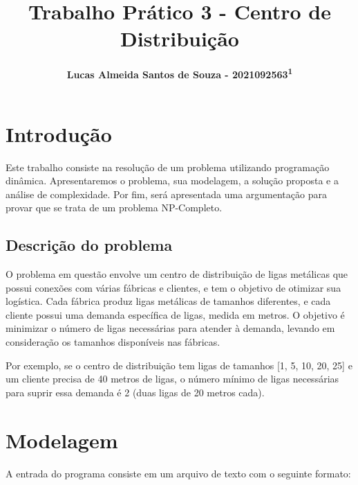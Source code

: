 \documentclass[12pt]{article}
\title{\textbf{Trabalho Prático 3 - Centro de Distribuição}}
\author{\textbf{Lucas Almeida Santos de Souza - 2021092563\textsuperscript{1}}}
\date{\parbox{\linewidth}{\centering%
	\textsuperscript{1}Universidade Federal de Minas Gerais (UFMG)\endgraf
	Belo Horizonte - MG - Brasil\endgraf\bigskip
	\href{mailto:luscaxalmeidass@ufmg.br}{luscaxalmeidass@ufmg.br}}}
\begin{document}
\maketitle


\section{Introdução}

	\par Este trabalho consiste na resolução de um problema utilizando programação dinâmica. Apresentaremos o problema, sua modelagem, a solução proposta e a análise de complexidade. Por fim, será apresentada uma argumentação para provar que se trata de um problema NP-Completo.

	\subsection*{Descrição do problema}

		\par O problema em questão envolve um centro de distribuição de ligas metálicas que possui conexões com várias fábricas e clientes, e tem o objetivo de otimizar sua logística. Cada fábrica produz ligas metálicas de tamanhos diferentes, e cada cliente possui uma demanda específica de ligas, medida em metros. O objetivo é minimizar o número de ligas necessárias para atender à demanda, levando em consideração os tamanhos disponíveis nas fábricas.

		\par Por exemplo, se o centro de distribuição tem ligas de tamanhos [1, 5, 10, 20, 25] e um cliente precisa de 40 metros de ligas, o número mínimo de ligas necessárias para suprir essa demanda é 2 (duas ligas de 20 metros cada).

\section{Modelagem}

	\par A entrada do programa consiste em um arquivo de texto com o seguinte formato:
\end{document}
